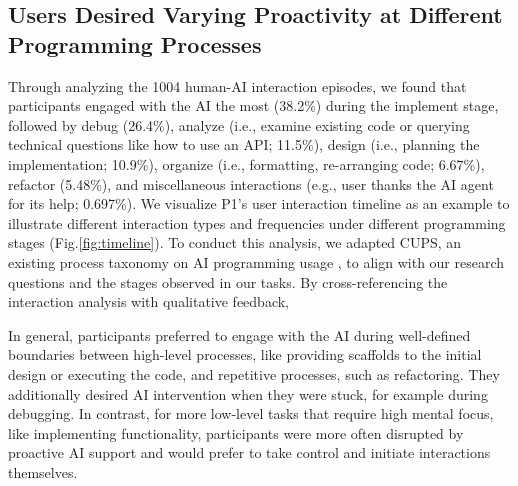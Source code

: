 \subsection{Users Desired Varying Proactivity at Different Programming Processes}
\label{Results:programming_process}
Through analyzing the 1004 human-AI interaction episodes, we found that participants engaged with the AI the most (38.2\%) during the implement stage, 
followed by debug (26.4\%), 
analyze (i.e., examine existing code or querying technical questions like how to use an API; 11.5\%), design (i.e., planning the implementation; 10.9\%), organize (i.e., formatting, re-arranging code; 6.67\%), refactor (5.48\%), and miscellaneous interactions (e.g., user thanks the AI agent for its help; 0.697\%). 
We visualize P1's user interaction timeline as an example to illustrate different interaction types and frequencies under different programming stages (Fig.\ref{fig:timeline}).
To conduct this analysis, we adapted CUPS, an existing process taxonomy on AI programming usage \cite{Mozannar2022ReadingBT}, to align with our research questions and the stages observed in our tasks. 
By cross-referencing the interaction analysis with qualitative feedback, 

In general, participants preferred to engage with the AI during well-defined boundaries between high-level processes, like providing scaffolds to the initial design or executing the code, and repetitive processes, such as refactoring.
They additionally desired AI intervention when they were stuck, for example during debugging.
In contrast, for more low-level tasks that require high mental focus, like implementing  functionality, participants were more often disrupted by proactive AI support and would prefer to take control and initiate interactions themselves.

